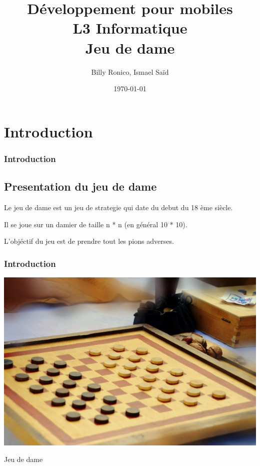 \documentclass{beamer}
\title[Dev. Mobiles -- L3 info]{Développement pour mobiles\\L3 Informatique\\\textbf{Jeu de dame}}
\author{Billy Ronico, Ismael Saïd}
\institute[DI]{Université de la Réunin}
\date{\today}
\begin{document}
\begin{frame}
  \titlepage
\end{frame}


\section{Introduction}
%
%
\begin{frame}
  \frametitle{Introduction}
    \subsection{Presentation du jeu de dame}
    Le jeu de dame est un jeu de strategie qui date du debut du 18 ème siècle. 
    
    Il se joue sur un damier de taille n * n (en général 10 * 10).

    L'objéctif du jeu est de prendre tout les pions adverses.

\end{frame}
%
%
\begin{frame}
  \frametitle{Introduction}

  \begin{center}
    \includegraphics[scale=0.5]{img_dame.jpg}
  \end{center}
  
  \begin{center}
    Jeu de dame
  \end{center}

\end{frame}
\end{document}
